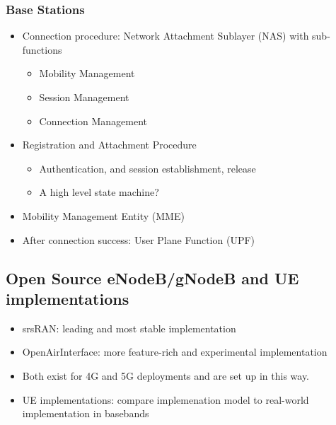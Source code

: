 \subsubsection{Base Stations}
\begin{itemize}
  \item Connection procedure: Network Attachment Sublayer (NAS) with sub-functions
    \begin{itemize}
      \item Mobility Management
      \item Session Management
      \item Connection Management
    \end{itemize}
  \item Registration and Attachment Procedure
  \begin{itemize}
    \item Authentication, and session establishment, release
    \item A high level state machine?
  \end{itemize}
  \item Mobility Management Entity (MME)
  \item After connection success: User Plane Function (UPF)
\end{itemize}
  


\subsection{Open Source eNodeB/gNodeB and UE implementations}

\begin{itemize}
  \item srsRAN: leading and most stable implementation
  \item OpenAirInterface: more feature-rich and experimental implementation
  \item Both exist for 4G and 5G deployments and are set up in this way.
  \item UE implementations: compare implemenation model to real-world implementation in basebands 
\end{itemize}
